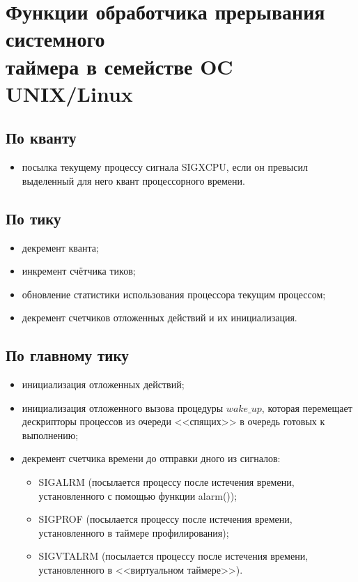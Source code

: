 \section{Функции обработчика прерывания системного \\ таймера в семействе OC UNIX/Linux}

\subsection*{По кванту}

\begin{itemize}[label*=--]
	\item посылка текущему процессу сигнала SIGXCPU, если он превысил выделенный для него квант процессорного времени.
\end{itemize}

\subsection*{По тику}

\begin{itemize}[label*=--]
	\item декремент кванта;
	\item инкремент счётчика тиков;
	\item обновление статистики использования процессора текущим процессом;
	\item декремент счетчиков отложенных действий и их инициализация.
\end{itemize}

\subsection*{По главному тику}

\begin{itemize}[label*=--]
	\item инициализация отложенных действий;
	\item инициализация отложенного вызова процедуры $wake\_up$, которая перемещает дескрипторы процессов из очереди <<спящих>> в очередь готовых к выполнению;
	\item декремент счетчика времени до отправки дного из сигналов:
	\begin{itemize}[label=•]
		\item SIGALRM (посылается процессу после истечения времени, установленного с помощью функции alarm());
		\item SIGPROF (посылается процессу после истечения времени, установленного в таймере профилирования);
		\item SIGVTALRM (посылается процессу после истечения времени, установленного в  <<виртуальном таймере>>).
	\end{itemize}
\end{itemize}

